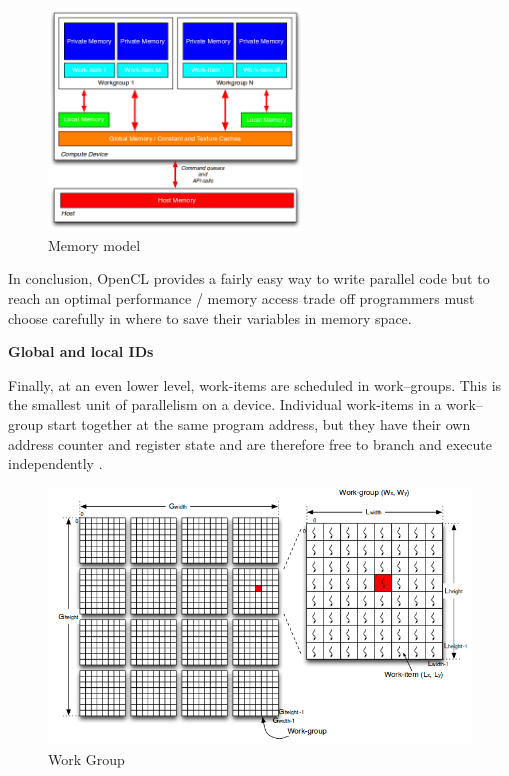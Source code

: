 \begin{figure}[H] \centering
  \includegraphics[width=0.6\textwidth]{./Figures/memory_model.png}
  \caption[Memory model]{Memory model \citep{Reference4}}
  \label{fig:memory_model} 
\end{figure}

In conclusion, OpenCL provides a fairly easy way to write parallel code but to
reach an optimal performance / memory access trade off programmers must choose
carefully in where to save their variables in memory space.

\textbf{Global and local IDs}

Finally, at an even lower level, work-items are scheduled in work–groups.
This is the smallest unit of parallelism on a device. Individual work-items in
a work–group  start together at the same program address, but they have their
own address counter and register state and are therefore free to branch and
execute independently \citep{Reference4}.

\begin{figure}[H] \centering
  \includegraphics[width=\textwidth]{./Figures/id.png} 
  \caption[Work - group]{Work Group \citep{Reference4}} 
  \label{fig:id} 
\end{figure}


